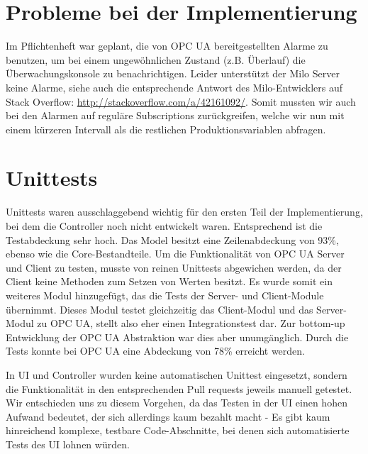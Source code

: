 \documentclass[parskip=full]{scrartcl}
\begin{document}
\section{Probleme bei der Implementierung}
Im Pflichtenheft war geplant, die von OPC UA bereitgestellten Alarme zu benutzen, um bei einem ungewöhnlichen Zustand (z.B. Überlauf)
die Überwachungskonsole zu benachrichtigen. Leider unterstützt der Milo Server keine Alarme, siehe auch die entsprechende Antwort
des Milo-Entwicklers auf Stack Overflow: \href{http://stackoverflow.com/a/42161092/}{http://stackoverflow.com/a/42161092/}.
Somit mussten wir auch bei den Alarmen auf reguläre Subscriptions zurückgreifen, welche wir nun mit einem kürzeren Intervall
als die restlichen Produktionsvariablen abfragen.

\section{Unittests}
Unittests waren ausschlaggebend wichtig für den ersten Teil der Implementierung, bei dem die Controller noch nicht entwickelt waren.
Entsprechend ist die Testabdeckung sehr hoch. Das Model besitzt eine Zeilenabdeckung von 93\%, ebenso wie die Core-Bestandteile.
Um die Funktionalität von OPC UA Server und Client zu testen, musste von reinen Unittests abgewichen werden, da der Client keine
Methoden zum Setzen von Werten besitzt. Es wurde somit ein weiteres Modul hinzugefügt, das die Tests der Server- und Client-Module übernimmt.
Dieses Modul testet gleichzeitig das Client-Modul und das Server-Modul zu OPC UA, stellt also eher einen Integrationstest dar. Zur bottom-up
Entwicklung der OPC UA Abstraktion war dies aber unumgänglich. Durch die Tests konnte bei OPC UA eine Abdeckung von 78\% erreicht werden.

In UI und Controller wurden keine automatischen Unittest eingesetzt, sondern die Funktionalität in den entsprechenden Pull requests
jeweils manuell getestet. Wir entschieden uns zu diesem Vorgehen, da das Testen in der UI einen hohen Aufwand bedeutet, der sich allerdings
kaum bezahlt macht - Es gibt kaum hinreichend komplexe, testbare Code-Abschnitte, bei denen sich automatisierte Tests des UI lohnen würden.

\pagebreak
{}
{}
\listoffigures
\end{document}
